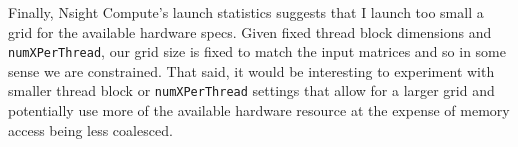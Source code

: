 \documentclass[12pt,letterpaper,twoside]{article}
\begin{document}
Finally, Nsight Compute's launch statistics suggests that I launch too small a grid for the
available hardware specs. Given fixed thread block dimensions and \texttt{numXPerThread},
our grid size is fixed to match the input matrices and so in some sense we are constrained. That
said, it would be interesting to experiment with smaller thread block or \texttt{numXPerThread}
settings that allow for a larger grid and potentially use more of the available hardware
resource at the expense of memory access being less coalesced.
\end{document}
